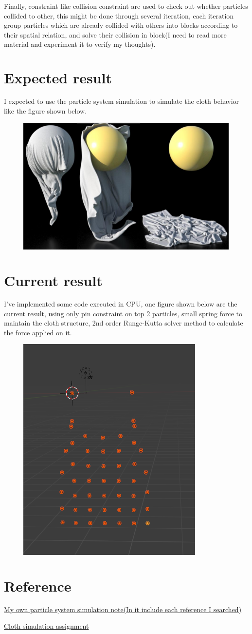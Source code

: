 \documentclass{article}
\begin{document}
	Finally, constraint like collision constraint are used to check out whether particles collided to other, this might be done through several iteration, each iteration group particles which are already collided with others into blocks according to their spatial relation, and solve their collision in block(I need to read more material and experiment it to verify my thoughts).
	\section{Expected result}
	I expected to use the particle system simulation to simulate the cloth behavior like the figure shown below.
	\begin{figure}
		\centering
		\includegraphics[width=0.6\linewidth]{ref1}
	\end{figure}
	\section{Current result}
	I've implemented some code executed in CPU, one figure shown below are the current result, using only pin constraint on top 2 particles, small spring force to maintain the cloth structure, 2nd order Runge-Kutta solver method to calculate the force applied on it.
	\begin{figure}[hb!]
	\centering
	\includegraphics[width=0.45\linewidth]{ref2}
	\end{figure}
	\section{Reference}
	\href{https://hackmd.io/HqFfw6ydSMe1-X-guUFJSA}{My own particle system simulation note(In it include each reference I searched)}
	
	\href{https://www.ics.uci.edu/~shz/courses/cs114/docs/proj3/index.html}{Cloth simulation assignment}
\end{document}

